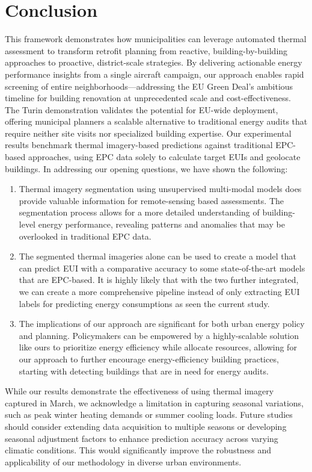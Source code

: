 \documentclass[preprint,12pt]{elsarticle}
\begin{document}
\section{Conclusion}
    This framework demonstrates how municipalities can leverage automated thermal assessment to transform retrofit planning from reactive, building-by-building approaches to proactive, district-scale strategies. By delivering actionable energy performance insights from a single aircraft campaign, our approach enables rapid screening of entire neighborhoods—addressing the EU Green Deal's ambitious timeline for building renovation at unprecedented scale and cost-effectiveness. The Turin demonstration validates the potential for EU-wide deployment, offering municipal planners a scalable alternative to traditional energy audits that require neither site visits nor specialized building expertise. Our experimental results benchmark thermal imagery-based predictions against traditional EPC-based approaches, using EPC data solely to calculate target EUIs and geolocate buildings. In addressing our opening questions, we have shown the following:
    
    \begin{enumerate}
        \item Thermal imagery segmentation using unsupervised multi-modal models does provide valuable information for remote-sensing based  assessments. The segmentation process allows for a more detailed understanding of building-level energy performance, revealing patterns and anomalies that may be overlooked in traditional EPC data.
        \item The segmented thermal imageries alone can be used  to create a model that can predict EUI with a comparative accuracy to some state-of-the-art models that are EPC-based. It is highly likely that with the two further integrated, we can create a more comprehensive pipeline instead of only extracting EUI labels for predicting energy consumptions as seen the current study.
        \item The implications of our approach are significant for both urban energy policy and planning. Policymakers can be empowered by a highly-scalable solution like ours to prioritize energy efficiency while allocate resources, allowing for our approach to further encourage energy-efficiency building practices, starting with detecting buildings that are in need for energy audits.
    \end{enumerate}
    
    While our results demonstrate the effectiveness of using thermal imagery captured in March, we acknowledge a limitation in capturing seasonal variations, such as peak winter heating demands or summer cooling loads. Future studies should consider extending data acquisition to multiple seasons or developing seasonal adjustment factors to enhance prediction accuracy across varying climatic conditions. This would significantly improve the robustness and applicability of our methodology in diverse urban environments.
    
\end{document}
